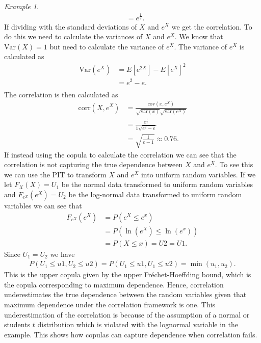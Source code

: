 \documentclass[%
a4paper,							
11pt,								
bibliography=totoc,						
abstracton=true					
]
{scrartcl}
\theoremstyle{plain}
\theoremstyle{definition}
\theoremstyle{remark}
\newtheorem{example}[theorem]{Example}
\newcommand{\1}{\mathbbm{1}}
\begin{document}
\begin{example}
\begin{align*}
         &= e^{\frac{1}{2}}.
    \end{align*}
    If dividing with the standard deviations of $X$ and $e^X$ we get the correlation. To do this we need to calculate the variances of $X$ and $e^X$. We know that $\mathrm{Var}(X) = 1$ but need to calculate the variance of $e^X$. The variance of $e^X$ is calculated as
    \begin{align*}
        \mathrm{Var}(e^X) &= E[e^{2X}] - E[e^X]^2\\
        &= e^2 - e.\\
    \end{align*}
    The correlation is then calculated as
    \begin{align*}
        \mathrm{corr}(X,e^X) &= \frac{\mathrm{cov}(x,e^X)}{\sqrt{\mathrm{var}(x)} \sqrt{\mathrm{var}(e^X)}}\\
        & = \frac{e^{\frac{1}{2}}}{1\sqrt{e^2-e}}\\
        &=\sqrt{\frac{1}{e-1}} \approx 0.76. 
    \end{align*}
    If instead using the copula to calculate the correlation we can see that the correlation is not capturing the true dependence between $X$ and $e^X$. To see this we can use the \gls{PIT} to transform $X$ and $e^X$ into uniform random variables. If we let $F_X(X)=U_1$ be the normal data transformed to uniform random variables and $F_{e^X}(e^X)=U_2$ be the log-normal data transformed to uniform random variables we can see that 
    \begin{align*}
        F_{e^X}(e^X) &= P(e^X \leq e^x)\\
        &= P(\ln(e^X) \leq \ln (e^x))\\
        &=P(X\leq x) = U2 = U1.
    \end{align*}
    Since $U_1 = U_2$ we have 
    \begin{align*}
        P(U_1\leq u1, U_2\leq u2) = P(U_1\leq u1, U_1\leq u2) = \min(u_1,u_2).
    \end{align*}
    This is the upper copula given by the upper Fréchet-Hoeffding bound, which is the copula corresponding to maximum dependence. Hence, correlation underestimates the true dependence between the random variables given that maximum dependence under the correlation framework is one. This underestimation of the correlation is because of the assumption of a normal or students $t$ distribution which is violated with the lognormal variable in the example. This shows how copulas can capture dependence when correlation fails. 


\end{example}
\end{document}
